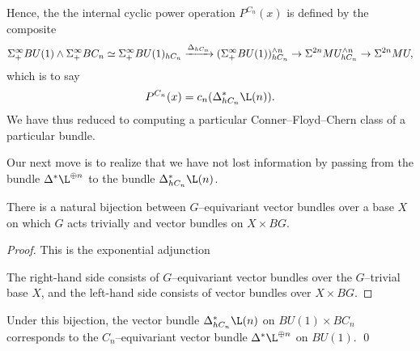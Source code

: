Hence, the the internal cyclic power operation $P^{C_n}(x)$ is defined by the composite \[\Sigma^\infty_+ BU(1) \wedge \Sigma^\infty_+ BC_n \simeq \Sigma^\infty_+ BU(1)_{hC_n} \xrightarrow{\Delta_{hC_n}} (\Sigma^\infty_+ BU(1))^{\wedge n}_{hC_n} \to \Sigma^{2n} MU^{\wedge n}_{hC_n} \to \Sigma^{2n} MU,\] which is to say \[P^{C_n}(x) = c_n(\Delta_{hC_n}^* \L(n)).\]  We have thus reduced to computing a particular Conner--Floyd--Chern class of a particular bundle.

Our next move is to realize that we have not lost information by passing from the bundle $\Delta^* \L^{\oplus n}$ to the bundle $\Delta_{hC_n}^* \L(n)$.
\begin{theorem}\label{GEquivBundlesVsBundlesOverBG}
There is a natural bijection between $G$--equivariant vector bundles over a base $X$ on which $G$ acts trivially and vector bundles on $X \times BG$.
\end{theorem}
\begin{proof}
This is the exponential adjunction
\begin{center}
\end{center}
The right-hand side consists of $G$--equivariant vector bundles over the $G$--trivial base $X$, and the left-hand side consists of vector bundles over $X \times BG$.
\end{proof}

\begin{corollary}
Under this bijection, the vector bundle $\Delta_{hC_n}^* \L(n)$ on $BU(1) \times BC_n$ corresponds to the $C_n$--equivariant vector bundle $\Delta^* \L^{\oplus n}$ on $BU(1)$. \qed
\end{corollary}

